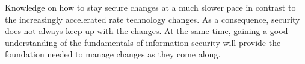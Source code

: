 Knowledge on how to stay secure changes at a much slower pace in contrast to the increasingly accelerated rate technology changes. As a consequence, security does not always keep up with the changes. At the same time, gaining a good understanding of the fundamentals of information security will provide the foundation needed to manage changes as they come along.
